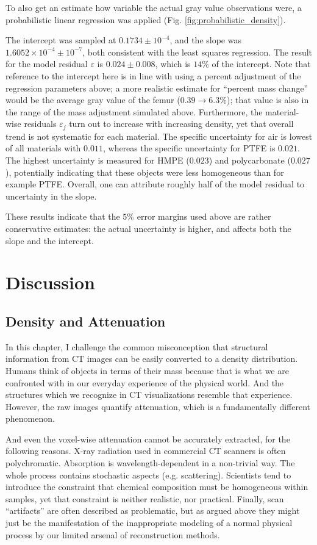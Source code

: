\bigskip
To also get an estimate how variable the actual gray value observations were, a probabilistic linear regression was applied (Fig. \ref{fig:probabilistic_density}).

The intercept was sampled at \(0.1734\pm 10^{-4}\), and the slope was \(1.6052\times 10^{-4} \pm 10^{-7}\), both consistent with the least squares regression.
The result for the model residual \(\varepsilon\) is \(0.024 \pm 0.008\), which is \(14 \%\) of the intercept.
Note that reference to the intercept here is in line with using a percent adjustment of the regression parameters above; a more realistic estimate for ``percent mass change'' would be the average gray value of the femur (\(0.39 \longrightarrow 6.3\%\)); that value is also in the range of the mass adjustment simulated above.
Furthermore, the material-wise residuals \(\varepsilon_{j}\) turn out to increase with increasing density, yet that overall trend is not systematic for each material.
The specific uncertainty for air is lowest of all materials with \(0.011\), whereas the specific uncertainty for PTFE is \(0.021\).
The highest uncertainty is measured for HMPE (\(0.023\)) and polycarbonate (\(0.027\)), potentially indicating that these objects were less homogeneous than for example PTFE.
Overall, one can attribute roughly half of the model residual to uncertainty in the slope.

These results indicate that the \(5 \%\) error margins used above are rather conservative estimates: the actual uncertainty is higher, and affects both the slope and the intercept.


\clearpage
\section{Discussion}
\label{sec:orgf10813f}
\subsection{Density and Attenuation}
\label{sec:org3b2c179}
In this chapter, I challenge the common misconception that structural information from CT images can be easily converted to a density distribution.
Humans think of objects in terms of their mass because that is what we are confronted with in our everyday experience of the physical world.
And the structures which we recognize in CT visualizations resemble that experience.
However, the raw images quantify attenuation, which is a fundamentally different phenomenon.


And even the voxel-wise attenuation cannot be accurately extracted, for the following reasons.
X-ray radiation used in commercial CT scanners is often polychromatic.
Absorption is wavelength-dependent in a non-trivial way.
The whole process contains stochastic aspects (e.g. scattering).
Scientists tend to introduce the constraint that chemical composition must be homogeneous within samples, yet that constraint is neither realistic, nor practical.
Finally, scan ``artifacts'' are often described as problematic, but as argued above they might just be the manifestation of the inappropriate modeling of a normal physical process by our limited arsenal of reconstruction methods.
